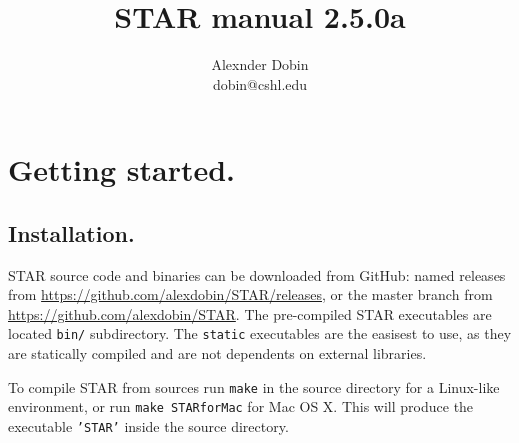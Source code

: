 \documentclass[12pt]{article}
\begin{document}
\hypersetup{
	linkcolor=MidnightBlue
	}


\newcommand{\optn}[1]{\sloppy\textcolor{violet}{\texttt{--#1}}}
\newcommand{\opt}[1]{\sloppy\hyperlink{#1}{\optn{#1}}}
\newcommand{\optv}[1]{\sloppy\texttt{#1}}
\newcommand{\optvr}[1]{\sloppy\textit{\texttt{#1}}}

\newcommand{\code}[1]{\sloppy\texttt{#1}}
	
\newcommand{\codelines}[1]{\begin{adjustwidth}{0.5in}{0in}
	\raggedright\texttt{#1}
	\end{adjustwidth}}

\newcommand{\ofilen}[1]{\sloppy\texttt{#1}}

\newcommand{\sechyperref}[1]{\hyperref[#1]{Section \ref{#1}. \nameref{#1}}}

\title{STAR manual 2.5.0a}
\author{Alexnder Dobin\\
dobin@cshl.edu}
\maketitle
\tableofcontents

\newpage

\section{Getting started.}
\subsection{Installation.}

STAR source code and binaries can be downloaded from GitHub: named releases from \url{https://github.com/alexdobin/STAR/releases}, or the master branch from \url{https://github.com/alexdobin/STAR}. The pre-compiled STAR executables are  located \code{bin/} subdirectory. The \code{static} executables are the easisest to use, as they are statically compiled and are not dependents on external libraries. 

To compile STAR from sources run \code{make} in the source directory for a Linux-like environment, or run \code{make STARforMac} for Mac OS X. This will produce the executable \code{'STAR'} inside the source directory.
\end{document}
